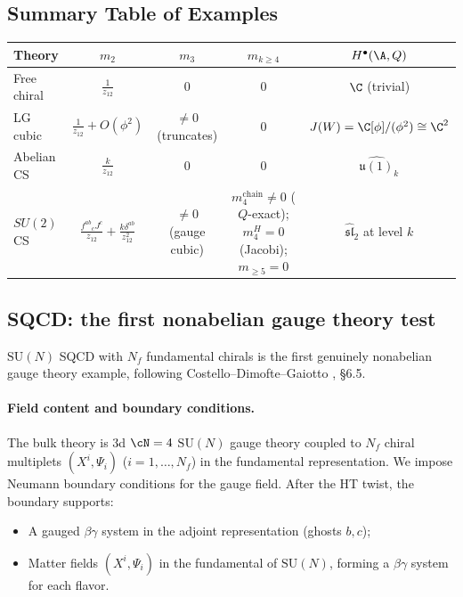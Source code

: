 \subsection{Summary Table of Examples}

\begin{center}
\begin{tabular}{|l|c|c|c|c|}
\hline
\textbf{Theory} & $m_2$ & $m_3$ & $m_{k \geq 4}$ & $H^\bullet(\A, Q)$ \\
\hline
Free chiral & $\frac{1}{z_{12}}$ & $0$ & $0$ & $\C$ (trivial) \\
\hline
LG cubic & $\frac{1}{z_{12}} + O(\phi^2)$ & $\neq 0$ (truncates) & $0$ & $J(W) = \C[\phi]/(\phi^2) \cong \C^2$ \\
\hline
Abelian CS & $\frac{k}{z_{12}}$ & $0$ & $0$ & $\widehat{\mathfrak{u}(1)}_k$ \\
\hline
$SU(2)$ CS & $\frac{f^{ab}{}_c J^c}{z_{12}} + \frac{k\delta^{ab}}{z_{12}^2}$ & $\neq 0$ (gauge cubic) & $m_4^{\mathrm{chain}} \neq 0$ ($Q$-exact); $m_4^H = 0$ (Jacobi); $m_{\geq 5} = 0$ & $\widehat{\mathfrak{sl}}_2$ at level $k$ \\
\hline
\end{tabular}
\end{center}

\subsection{SQCD: the first nonabelian gauge theory test}

\providecommand{\QBRST}{Q_{\mathrm{BRST}}}

$\mathrm{SU}(N)$ SQCD with $N_f$
fundamental chirals is the first genuinely nonabelian gauge theory
example, following Costello--Dimofte--Gaiotto
\cite{CDG2023}, \S6.5.

\paragraph{Field content and boundary conditions.}
The bulk theory is $3$d $\cN=4$ $\mathrm{SU}(N)$ gauge theory coupled to
$N_f$ chiral multiplets $(X^i, \Psi_i)$ ($i = 1, \ldots, N_f$) in the
fundamental representation. We impose Neumann boundary conditions for the
gauge field. After the HT twist, the boundary supports:
\begin{itemize}
\item A gauged $\beta\gamma$ system in the adjoint representation
 (ghosts $b, c$);
\item Matter fields $(X^i, \Psi_i)$ in the fundamental of
 $\mathrm{SU}(N)$, forming a $\beta\gamma$ system for each flavor.
\end{itemize}

